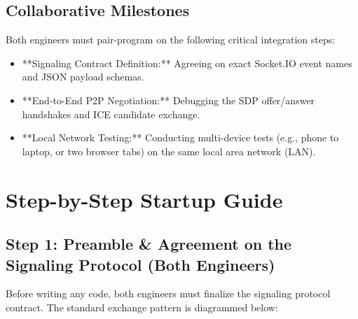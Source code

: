 \documentclass[11pt,a4paper]{article}
\begin{document}
\subsection{Collaborative Milestones}
Both engineers must pair-program on the following critical integration steps:
\begin{itemize}
    \item **Signaling Contract Definition:** Agreeing on exact Socket.IO event names and JSON payload schemas.
    \item **End-to-End P2P Negotiation:** Debugging the SDP offer/answer handshakes and ICE candidate exchange.
    \item **Local Network Testing:** Conducting multi-device tests (e.g., phone to laptop, or two browser tabs) on the same local area network (LAN).
\end{itemize}

\newpage

\section{Step-by-Step Startup Guide}

\subsection{Step 1: Preamble \& Agreement on the Signaling Protocol (Both Engineers)}
Before writing any code, both engineers must finalize the signaling protocol contract. The standard exchange pattern is diagrammed below:
\end{document}
